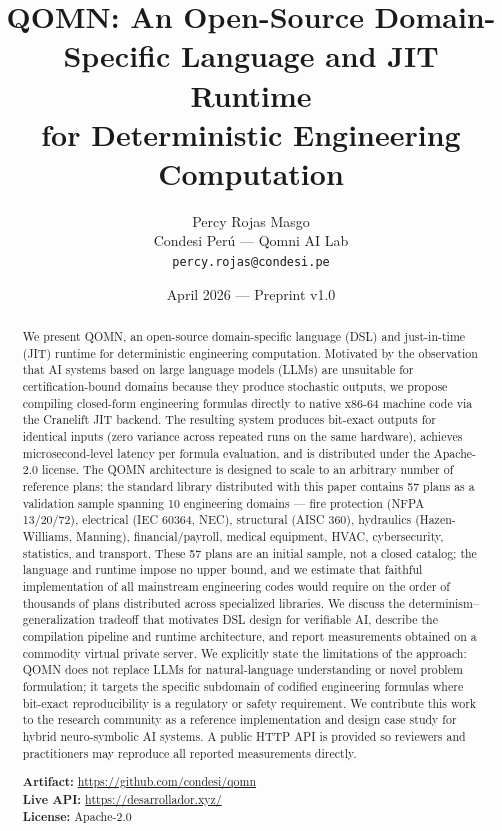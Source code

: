 \documentclass[11pt,a4paper]{article}
\title{QOMN: An Open-Source Domain-Specific Language and JIT Runtime \\
       for Deterministic Engineering Computation}
\author{Percy Rojas Masgo \\
        Condesi Per\'u --- Qomni AI Lab \\
        \texttt{percy.rojas@condesi.pe}}
\date{April 2026 --- Preprint v1.0}
\begin{document}
\maketitle

\begin{abstract}
We present QOMN, an open-source domain-specific language (DSL) and just-in-time (JIT) runtime for deterministic engineering computation. Motivated by the observation that AI systems based on large language models (LLMs) are unsuitable for certification-bound domains because they produce stochastic outputs, we propose compiling closed-form engineering formulas directly to native x86-64 machine code via the Cranelift JIT backend. The resulting system produces bit-exact outputs for identical inputs (zero variance across repeated runs on the same hardware), achieves microsecond-level latency per formula evaluation, and is distributed under the Apache-2.0 license. The QOMN architecture is designed to scale to an arbitrary number of reference plans; the standard library distributed with this paper contains 57 plans as a validation sample spanning 10 engineering domains --- fire protection (NFPA 13/20/72), electrical (IEC 60364, NEC), structural (AISC 360), hydraulics (Hazen-Williams, Manning), financial/payroll, medical equipment, HVAC, cybersecurity, statistics, and transport. These 57 plans are an initial sample, not a closed catalog; the language and runtime impose no upper bound, and we estimate that faithful implementation of all mainstream engineering codes would require on the order of thousands of plans distributed across specialized libraries. We discuss the determinism--generalization tradeoff that motivates DSL design for verifiable AI, describe the compilation pipeline and runtime architecture, and report measurements obtained on a commodity virtual private server. We explicitly state the limitations of the approach: QOMN does not replace LLMs for natural-language understanding or novel problem formulation; it targets the specific subdomain of codified engineering formulas where bit-exact reproducibility is a regulatory or safety requirement. We contribute this work to the research community as a reference implementation and design case study for hybrid neuro-symbolic AI systems. A public HTTP API is provided so reviewers and practitioners may reproduce all reported measurements directly.

\vspace{0.5em}
\noindent\textbf{Artifact:} \url{https://github.com/condesi/qomn} \\
\noindent\textbf{Live API:} \url{https://desarrollador.xyz/} \\
\noindent\textbf{License:} Apache-2.0
\end{abstract}
\end{document}
